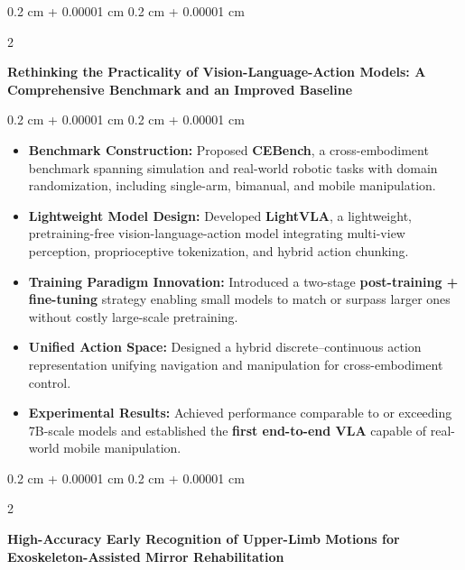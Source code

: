 \documentclass[10pt, letterpaper]{article}
\newenvironment{highlights}{
    \begin{itemize}[
        topsep=0.10 cm,
        parsep=0.10 cm,
        partopsep=0pt,
        itemsep=0pt,
        leftmargin=0.4 cm + 10pt
    ]
}{
    \end{itemize}
} %
\newenvironment{onecolentry}{
    \begin{adjustwidth}{
        0.2 cm + 0.00001 cm
    }{
        0.2 cm + 0.00001 cm
    }
}{
    \end{adjustwidth}
} %
\newenvironment{twocolentry}[2][]{
    \onecolentry
    \def\secondColumn{#2}
    \setcolumnwidth{\fill, 4.5 cm}
    \begin{paracol}{2}
}{
    \switchcolumn \raggedleft \secondColumn
    \end{paracol}
    \endonecolentry
} %
\begin{document}
\vspace{0.2 cm}

\begin{twocolentry}{}
    \begin{minipage}[t]{\textwidth}
        \justifying
        \textbf{Rethinking the Practicality of Vision-Language-Action Models: A Comprehensive Benchmark and an Improved Baseline}
    \end{minipage}
\end{twocolentry}

\vspace{0.10 cm}
\begin{onecolentry}
    \begin{highlights}
        \item \textbf{Benchmark Construction:} Proposed \textbf{CEBench}, a cross-embodiment benchmark spanning simulation and real-world robotic tasks with domain randomization, including single-arm, bimanual, and mobile manipulation.

        \item \textbf{Lightweight Model Design:} Developed \textbf{LightVLA}, a lightweight, pretraining-free vision-language-action model integrating multi-view perception, proprioceptive tokenization, and hybrid action chunking.

        \item \textbf{Training Paradigm Innovation:} Introduced a two-stage \textbf{post-training + fine-tuning} strategy enabling small models to match or surpass larger ones without costly large-scale pretraining.

        \item \textbf{Unified Action Space:} Designed a hybrid discrete–continuous action representation unifying navigation and manipulation for cross-embodiment control.

        \item \textbf{Experimental Results:} Achieved performance comparable to or exceeding 7B-scale models and established the \textbf{first end-to-end VLA} capable of real-world mobile manipulation.
    \end{highlights}
\end{onecolentry}

\vspace{0.2 cm}

\begin{twocolentry}{}
    \begin{minipage}[t]{\textwidth}
        \justifying
        \textbf{High-Accuracy Early Recognition of Upper-Limb Motions for Exoskeleton-Assisted Mirror Rehabilitation}
    \end{minipage}
\end{twocolentry}
\end{document}
